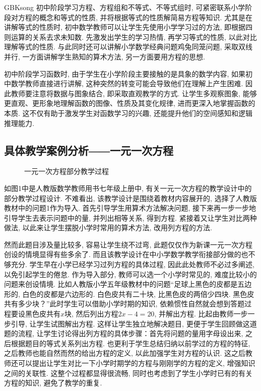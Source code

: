 \documentclass[a4paper,12pt,twoside]{ctexart}
\begin{document}
\begin{CJK*}{GBK}{song}
初中阶段学习方程、方程组和不等式、不等式组时, 可紧密联系小学阶段对方程的概念和等式的性质, 并将根据等式的性质解简易方程等知识. 尤其是在讲解等式的性质时, 初中数学教师可以让学生先使用小学学习过的方法, 即根据四则运算的关系去求未知数. 先激发出学生的学习热情, 再学习等式的性质, 以此对比理解等式的性质. 与此同时还可以讲解小学数学经典问题鸡兔同笼问题, 采取双线并行, 一方面讲解学生熟知的算术方法, 另一方面要用方程的思想.

初中阶段学习函数时, 由于学生在小学阶段主要接触的是具象的数学内容, 如果初中数学教师直接进行讲解, 这种突然的转变可能会导致他们在理解上产生困难. 因此教师要注意将数据与图象结合, 即采取直观教学的方式. 让学生多观察图象, 能够更直观、更形象地理解函数的图像、性质及其变化规律, 进而更深入地掌握函数的本质. 这不仅有助于激发学生对函数学习的兴趣, 还能提升他们的空间感知和逻辑推理能力.
\subsection{具体教学案例分析――一元一次方程}
\begin{figure}[H]
 \centering
	\caption{一元一次方程部分教学过程}
\end{figure}

如图1中是人教版数学教师用书七年级上册中,  有关一元一次方程的教学设计中的部分教学过程设计. 不难看出, 该教学设计是围绕着教材内容展开的, 选择了人教版教材中的问题1作为导入.  首先引导学生用算术方法解决问题,  接下来再一步一步地引导学生去表示问题中的量,  并列出相等关系,  得到方程.  紧接着又让学生对比两种做法,  以此来让学生摆脱小学时常用的算术方法,  改用列方程的方法.

然而此题目涉及量比较多, 容易让学生绕不过弯,  此题仅仅作为新课一元一次方程创设的情境显得有些多余了. 而且该教学设计在中小学数学教学衔接部分做的也不够充分. 学生早在小学已经学习过列方程的具体过程,  因此此处教师不必过多阐述,  以免引起学生的倦怠. 作为导入部分, 教师可以选一个小学时常见的, 难度比较小的问题来创设情境. 比如人教版小学五年级教材中的问题“足球上黑色的皮都是五边形的, 白色的皮都是六边形的. 白色皮共有二十块, 比黑色皮的两倍少四块. 黑色皮共有多少块？”此时学生可以借助小学时期的知识, 依赖惯性自然就会想到答题过程要设黑色皮共有$x$块, 然后列出方程$2x-4=20$, 并解出方程. 比起由教师一步一步引导, 让学生试图解出方程. 这样让学生独立地解决题目, 更便于学生回顾做这道题的流程, 让学生讨论得出列方程的具体步骤：首先将问题的量用字母设出来, 之后根据题目的等式关系列出方程. 也更利于学生总结归纳以前学过的方程的特征,  之后教师也能自然而然的给出方程的定义,  以此加强学生对方程的认识. 这之后教师还可以提出让学生对比一下小学时期学的方程与刚刚学的方程的定义,  增强知识之间的关联性. 这整个过程都显得很流畅, 同时也考虑到了学生小学时已有的有关方程的知识, 避免了教学的重复.


\end{CJK*}
\end{document}
